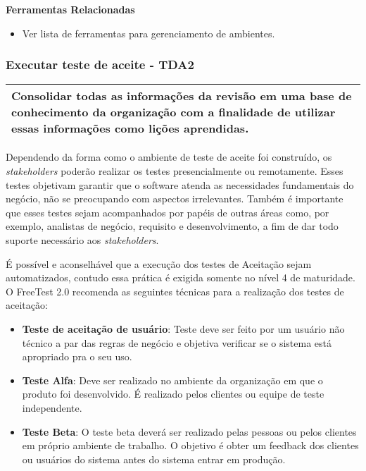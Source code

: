 \textbf{Ferramentas Relacionadas }
\begin{itemize}
    \item Ver lista de ferramentas para gerenciamento de ambientes. 
\end{itemize}

\subsubsection{Executar teste de aceite - TDA2}
\label{sec:tda2}

\begin{table}[!ht]
\centering
\begin{tabular}{|p{130mm}|}
\hline
Consolidar todas as informações da revisão em uma base de conhecimento da organização com a finalidade de utilizar essas informações como lições aprendidas. \\ 
\hline
\end{tabular}
\end{table}

Dependendo da forma como o ambiente de teste de aceite foi construído, os \textit{stakeholders} poderão realizar os testes presencialmente ou remotamente. Esses testes objetivam garantir que o software atenda as necessidades fundamentais do negócio, não se preocupando com aspectos irrelevantes. Também é importante que esses testes sejam acompanhados por papéis de outras áreas como, por exemplo, analistas de negócio, requisito e desenvolvimento, a fim de dar todo suporte necessário aos \textit{stakeholders}.

É possível e aconselhável que a execução dos testes de Aceitação sejam automatizados, contudo essa prática é exigida somente no nível 4 de maturidade. O FreeTest 2.0 recomenda as seguintes técnicas para a realização dos testes de aceitação: 

\begin{itemize}
    \item \textbf{Teste de aceitação de usuário}: Teste deve ser feito por um usuário não técnico a par das regras de negócio e objetiva verificar se o sistema está apropriado pra o seu uso.
    \item \textbf{Teste Alfa}: Deve ser realizado no ambiente da organização em que o produto foi desenvolvido. É realizado pelos clientes ou equipe de teste independente.
    \item \textbf{Teste Beta}: O teste beta deverá ser realizado pelas pessoas ou pelos clientes em próprio ambiente de trabalho. O objetivo é obter um feedback dos clientes ou usuários do sistema antes do sistema entrar em produção.
\end{itemize}

